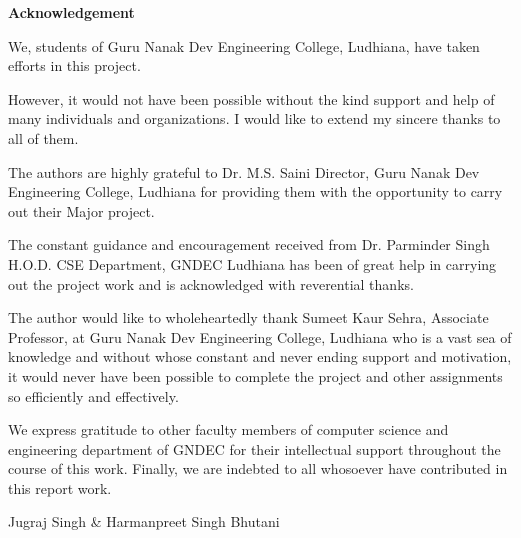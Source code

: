 \begin{center}
	\Huge \textbf{Acknowledgement}
\end{center}
We, students of Guru Nanak Dev Engineering College, Ludhiana, have taken efforts in this project.

However, it would not have been possible without the kind support and help of many individuals and organizations. I would like to extend my sincere thanks to all of them.

The authors are highly grateful to Dr. M.S. Saini Director, Guru Nanak Dev Engineering College, Ludhiana for providing them with the opportunity to carry out their Major project.

The constant guidance and encouragement received from Dr. Parminder Singh H.O.D. CSE Department, GNDEC Ludhiana has been of great help in carrying out the project work and is acknowledged with reverential thanks.

The author would like to wholeheartedly thank Sumeet Kaur Sehra, Associate Professor, at Guru Nanak Dev Engineering College, Ludhiana who is a vast sea of knowledge and
without whose constant and never ending support and motivation, it would never have been possible to complete the project and other assignments so efficiently and effectively.

We express gratitude to other faculty members of computer science and engineering department of GNDEC for their intellectual support throughout the course of this work.   Finally, we are indebted to all whosoever have contributed in this report work.

\vskip 1.0cm 
\noindent Jugraj Singh \& Harmanpreet Singh Bhutani